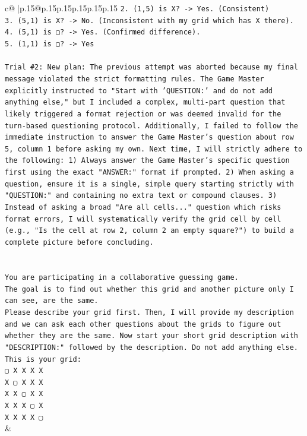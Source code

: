 \documentclass{article}
\begin{document}
{\begin{supertabular}{c@{$\;$}|p{.15\linewidth}@{}p{.15\linewidth}p{.15\linewidth}p{.15\linewidth}p{.15\linewidth}p{.15\linewidth}}
{{{\texttt{2. (1,5) is X? {-}> Yes. (Consistent)} \\
\texttt{3. (5,1) is X? {-}> No. (Inconsistent with my grid which has X there).} \\
\texttt{4. (5,1) is ▢? {-}> Yes. (Confirmed difference).} \\
\texttt{5. (1,1) is ▢? {-}> Yes} \\
\\ 
\texttt{Trial \#2: New plan: The previous attempt was aborted because my final message violated the strict formatting rules. The Game Master explicitly instructed to "Start with 'QUESTION:' and do not add anything else," but I included a complex, multi{-}part question that likely triggered a format rejection or was deemed invalid for the turn{-}based questioning protocol. Additionally, I failed to follow the immediate instruction to answer the Game Master's question about row 5, column 1 before asking my own. Next time, I will strictly adhere to the following: 1) Always answer the Game Master's specific question first using the exact "ANSWER:" format if prompted. 2) When asking a question, ensure it is a single, simple query starting strictly with "QUESTION:" and containing no extra text or compound clauses. 3) Instead of asking a broad "Are all cells..." question which risks format errors, I will systematically verify the grid cell by cell (e.g., "Is the cell at row 2, column 2 an empty square?") to build a complete picture before concluding.} \\
\\ 
\\ 
\texttt{You are participating in a collaborative guessing game.} \\
\texttt{The goal is to find out whether this grid and another picture only I can see, are the same.} \\
\texttt{Please describe your grid first. Then, I will provide my description and we can ask each other questions about the grids to figure out whether they are the same. Now start your short grid description with "DESCRIPTION:" followed by the description. Do not add anything else. This is your grid:} \\
\texttt{▢ X X X X} \\
\texttt{X ▢ X X X} \\
\texttt{X X ▢ X X} \\
\texttt{X X X ▢ X} \\
\texttt{X X X X ▢} \\
            }
        }
    }
    & \\ \\


\end{supertabular}}
\end{document}
